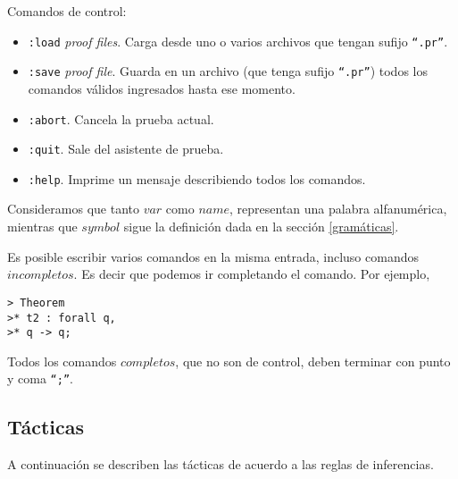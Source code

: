 \documentclass[a4paper,11pt]{article}
\theoremstyle{definition}
\theoremstyle{remark}
\begin{document}
Comandos de control: 

\begin{itemize}

\item \texttt{:load} \textit{proof files}. Carga desde uno o varios archivos que tengan sufijo \texttt{``.pr''}.

\item \texttt{:save} \textit{proof file}. Guarda en un archivo (que tenga sufijo \texttt{``.pr''}) todos los comandos válidos ingresados hasta ese momento.

\item \texttt{:abort}. Cancela la prueba actual.

\item \texttt{:quit}. Sale del asistente de prueba.

\item \texttt{:help}. Imprime un mensaje describiendo todos los comandos.

\end{itemize}

Consideramos que tanto $var$ como $name$, representan una palabra alfanumérica, mientras
que $symbol$ sigue la definición dada en la sección \ref{gramáticas}. 

Es posible escribir varios comandos en la misma entrada,
incluso comandos $incompletos$. Es decir que podemos ir completando el comando. 
Por ejemplo,

\begin{verbatim}
> Theorem 
>* t2 : forall q,
>* q -> q;
\end{verbatim}

Todos los comandos $completos$, que no son de control, deben terminar con punto y coma \texttt{``;''}. 

\subsection{Tácticas}
\label{tácticas}

A continuación se describen las tácticas de acuerdo a las reglas de inferencias.
\end{document}
